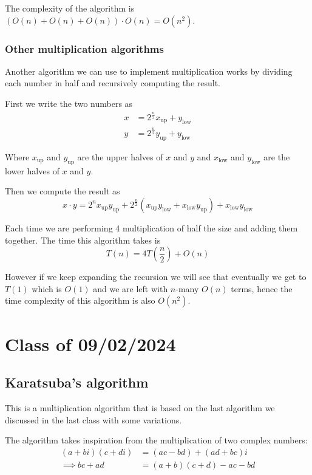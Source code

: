 \documentclass[10pt]{extarticle}
\begin{document}
The complexity of the algorithm is $(O(n) + O(n) + O(n)) \cdot O(n) = O(n^2)$.

\subsubsection{Other multiplication algorithms}

Another algorithm we can use to implement multiplication works by dividing each number in half and recursively computing the result.

First we write the two numbers as
\begin{align*}
    x & = 2^{\frac{n}{2}}x_{\text{up}} + y_{\text{low}} \\
    y & = 2^{\frac{n}{2}}y_{\text{up}} + y_{\text{low}}
\end{align*}

Where $x_{\text{up}}$ and $y_{\text{up}}$ are the upper halves of $x$ and $y$ and $x_{\text{low}}$ and $y_{\text{low}}$ are the lower halves of $x$ and $y$.

Then we compute the result as
$$
    x \cdot y = 2^n x_{\text{up}}y_{\text{up}} + 2^{\frac{n}{2}}(x_{\text{up}}y_{\text{low}} + x_{\text{low}}y_{\text{up}}) + x_{\text{low}}y_{\text{low}}
$$

Each time we are performing 4 multiplication of half the size and adding them together.
The time this algorithm takes is
$$
    T(n) = 4T\left(\frac{n}{2}\right) + O(n)
$$

However if we keep expanding the recursion we will see that eventually we get to $T(1)$ which is $O(1)$
and we are left with $n$-many $O(n)$ terms, hence the time complexity of this algorithm is also $O(n^2)$.

\section{Class of 09/02/2024}

\subsection{Karatsuba's algorithm}

This is a multiplication algorithm that is based on the last algorithm we discussed in the last class with some variations.

The algorithm takes inspiration from the multiplication of two complex numbers:
\begin{align*}
    (a + bi)(c + di) & = (ac - bd) + (ad + bc)i   \\
    \implies bc + ad & = (a + b)(c + d) - ac - bd
\end{align*}
\end{document}
